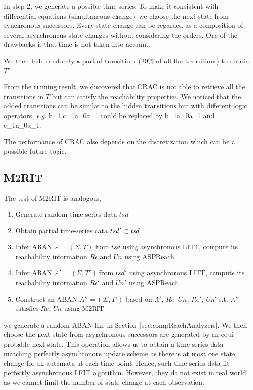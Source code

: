 In step 2, we generate a possible time-series.
To make it consistent with differential equations (simultaneous change), we choose the next state from synchronous successors.
Every state change can be regarded as a composition of several asynchronous state changes without considering the orders.
One of the drawbacks is that time is not taken into account.

We then hide randomly a part of transitions (20\% of all the transitions) to obtain $T'$. %

From the running result, we discovered that CRAC is not able to retrieve all the transitions in $T$ but can satisfy the reachability properties.
We noticed that the added transitions can be similar to the hidden transitions but with different logic operators, \textit{e.g.} \ac{b_1,c_1}{a_0}{a_1} could be replaced by \ac{b_1}{a_0}{a_1} and \ac{c_1}{a_0}{a_1}.

The performance of CRAC also depends on the discretization  which can be a possible future topic.


\subsection{M2RIT}
The test of M2RIT is analogous,
\begin{enumerate}
    \item Generate random time-series data $tsd$
    \item Obtain partial time-series data $tsd'\subset tsd$
    \item Infer ABAN $A=(\Sigma, T)$ from $tsd$ using asynchronous LFIT, compute its reachability information $Re$ and $Un$ using ASPReach
    \item Infer ABAN $A'=(\Sigma, T')$ from $tsd'$ using asynchronous LFIT, compute its reachability information $Re'$ and $Un'$ using ASPReach
    \item Construct an ABAN $A''=(\Sigma, T')$ based on $A'$, $Re$, $Un$, $Re'$, $Un'$ s.t. $A''$ satisfies $Re$, $Un$ using M2RIT
\end{enumerate}
we generate a random ABAN like in Section~\ref{sec:compReachAnalyzers}.
We then choose the next state from asynchronous successors are generated by an equi-probable next state.
This operation allows us to obtain a time-series data matching perfectly asynchronous update scheme as there is at most one state change for all automata at each time point. 
Hence, such time-series data fit perfectly asynchronous LFIT algorithm.
However, they do not exist in real world as we cannot limit the number of state change at each observation.

